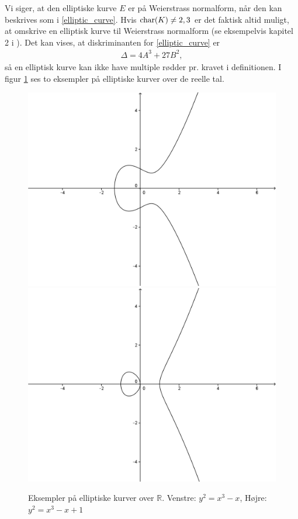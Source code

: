 Vi siger, at den elliptiske kurve $E$ er på Weierstrass normalform, når den kan beskrives som i \eqref{elliptic_curve}. Hvis $\text{char} (K) \neq 2, 3$ er det faktisk altid muligt, at omskrive en elliptisk kurve til Weierstrass normalform (se eksempelvis kapitel 2 i \cite{Washington}). Det kan vises, at diskriminanten for \eqref{elliptic_curve} er \begin{align*}
	\Delta = 4A^3 + 27B^2,
\end{align*}
så en elliptisk kurve kan ikke have multiple rødder pr. kravet i definitionen. I figur \ref{figure_elliptic_curves} ses to eksempler på elliptiske kurver over de reelle tal.
\begin{figure}
\label{figure_elliptic_curves}
\centering
\includegraphics[scale=0.2]{elliptic_1}
\includegraphics[scale=0.2]{elliptic_2}
\caption{Eksempler på elliptiske kurver over $\mathbb{R}$. Venstre: $y^2 = x^3 - x$, Højre: $y^2 = x^3 -x + 1$}
\end{figure}
